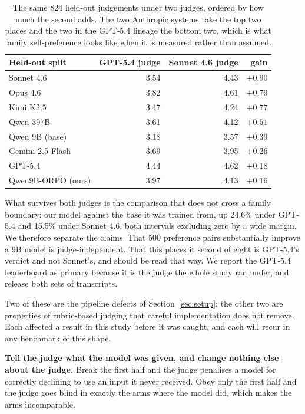 \begin{table}[H]
\centering
\small
\begin{tabular}{lrrr}
\toprule
\textbf{Held-out split} & \textbf{GPT-5.4 judge} & \textbf{Sonnet 4.6 judge} & \textbf{gain} \\
\midrule
Sonnet 4.6 & 3.54 & 4.43 & $+0.90$ \\
Opus 4.6 & 3.82 & 4.61 & $+0.79$ \\
Kimi K2.5 & 3.47 & 4.24 & $+0.77$ \\
Qwen 397B & 3.61 & 4.12 & $+0.51$ \\
Qwen 9B (base) & 3.18 & 3.57 & $+0.39$ \\
Gemini 2.5 Flash & 3.69 & 3.95 & $+0.26$ \\
GPT-5.4 & 4.44 & 4.62 & $+0.18$ \\
Qwen9B-ORPO (ours) & 3.97 & 4.13 & $+0.16$ \\
\bottomrule
\end{tabular}
\caption{The same 824 held-out judgements under two judges, ordered by how much
the second adds. The two Anthropic systems take the top two places and the two in
the GPT-5.4 lineage the bottom two, which is what family self-preference looks
like when it is measured rather than assumed.}
\label{tab:crossjudge}
\end{table}

What survives both judges is the comparison that does not cross a family
boundary: our model against the base it was trained from, up 24.6\% under GPT-5.4
and 15.5\% under Sonnet 4.6, both intervals excluding zero by a wide margin. We
therefore separate the claims. That 500 preference pairs substantially improve a
9B model is judge-independent. That this places it second of eight is GPT-5.4's
verdict and not Sonnet's, and should be read that way. We report the GPT-5.4
leaderboard as primary because it is the judge the whole study ran under, and
release both sets of transcripts.

Two of these are the pipeline defects of Section~\ref{sec:setup}; the other two
are properties of rubric-based judging that careful implementation does not
remove. Each affected a result in this study before it was caught, and each will
recur in any benchmark of this shape.

\textbf{Tell the judge what the model was given, and change nothing else about
the judge.} Break the first half and the judge penalises a model for correctly
declining to use an input it never received. Obey only the first half and the
judge goes blind in exactly the arms where the model did, which makes the arms
incomparable.

